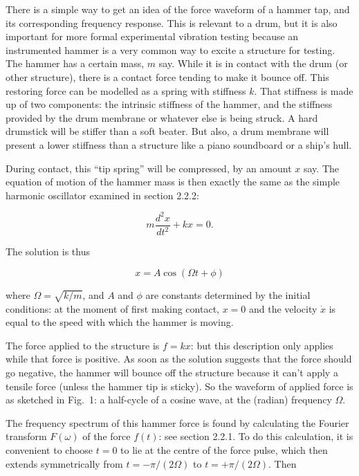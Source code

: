   There is a simple way to get an idea of the force waveform of a hammer tap, 
  and its corresponding frequency response. This is relevant to a drum, but it 
  is also important for more formal experimental vibration testing because an 
  instrumented hammer is a very common way to excite a structure for testing. 
  The hammer has a certain mass, $m$ say. While it is in contact with the drum 
  (or other structure), there is a contact force tending to make it bounce off. 
  This restoring force can be modelled as a spring with stiffness $k$. That 
  stiffness is made up of two components: the intrinsic stiffness of the 
  hammer, and the stiffness provided by the drum membrane or whatever else is 
  being struck. A hard drumstick will be stiffer than a soft beater. But also, 
  a drum membrane will present a lower stiffness than a structure like a piano 
  soundboard or a ship's hull. 

  During contact, this ``tip spring'' will be compressed, by an amount $x$ say. 
  The equation of motion of the hammer mass is then exactly the same as the 
  simple harmonic oscillator examined in section 2.2.2: 

  $$m \dfrac{d^2 x}{dt^2}+kx=0. \tag{1}$$ 

  The solution is thus 

  $$x=A \cos(\Omega t + \phi) \tag{2}$$ 

  where $\Omega=\sqrt{k/m}$, and $A$ and $\phi$ are constants determined by the 
  initial conditions: at the moment of first making contact, $x=0$ and the 
  velocity $\dot{x}$ is equal to the speed with which the hammer is moving. 

  The force applied to the structure is $f=kx$: but this description only 
  applies while that force is positive. As soon as the solution suggests that 
  the force should go negative, the hammer will bounce off the structure 
  because it can't apply a tensile force (unless the hammer tip is sticky). So 
  the waveform of applied force is as sketched in Fig.\ 1: a half-cycle of a 
  cosine wave, at the (radian) frequency $\Omega$. 


  The frequency spectrum of this hammer force is found by calculating the 
  Fourier transform $F(\omega)$ of the force $f(t)$: see section 2.2.1. To do 
  this calculation, it is convenient to choose $t=0$ to lie at the centre of 
  the force pulse, which then extends symmetrically from $t=-\pi / (2 \Omega)$ 
  to $t=+\pi / (2 \Omega)$. Then 

